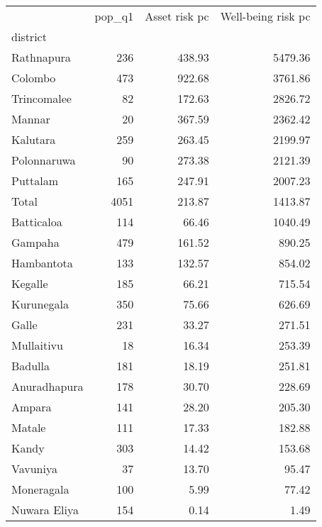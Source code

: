 \begin{tabular}{lrrr}
\toprule
{} &  pop\_q1 &  Asset risk pc &  Well-being risk pc \\
district     &         &                &                     \\
\midrule
Rathnapura   &     236 &         438.93 &             5479.36 \\
Colombo      &     473 &         922.68 &             3761.86 \\
Trincomalee  &      82 &         172.63 &             2826.72 \\
Mannar       &      20 &         367.59 &             2362.42 \\
Kalutara     &     259 &         263.45 &             2199.97 \\
Polonnaruwa  &      90 &         273.38 &             2121.39 \\
Puttalam     &     165 &         247.91 &             2007.23 \\
Total        &    4051 &         213.87 &             1413.87 \\
Batticaloa   &     114 &          66.46 &             1040.49 \\
Gampaha      &     479 &         161.52 &              890.25 \\
Hambantota   &     133 &         132.57 &              854.02 \\
Kegalle      &     185 &          66.21 &              715.54 \\
Kurunegala   &     350 &          75.66 &              626.69 \\
Galle        &     231 &          33.27 &              271.51 \\
Mullaitivu   &      18 &          16.34 &              253.39 \\
Badulla      &     181 &          18.19 &              251.81 \\
Anuradhapura &     178 &          30.70 &              228.69 \\
Ampara       &     141 &          28.20 &              205.30 \\
Matale       &     111 &          17.33 &              182.88 \\
Kandy        &     303 &          14.42 &              153.68 \\
Vavuniya     &      37 &          13.70 &               95.47 \\
Moneragala   &     100 &           5.99 &               77.42 \\
Nuwara Eliya &     154 &           0.14 &                1.49 \\
\bottomrule
\end{tabular}
